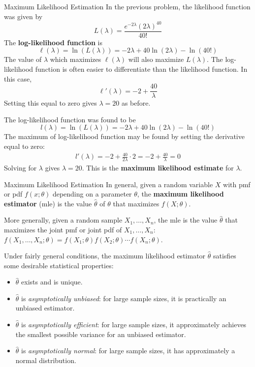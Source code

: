 \documentclass[handout]{beamer}
\renewcommand{\emph}{\textbf}
\begin{document}
\begin{frame}{Maximum Likelihood Estimation}
In the previous problem, the likelihood function was given by
$$L(\lambda)=\frac{e^{-2\lambda}(2\lambda)^{40}}{40!}$$
\pause The \emph{log-likelihood function} is
$$\ell(\lambda) = \ln(L(\lambda)) = -2\lambda+40\ln(2\lambda)-\ln(40!)$$
\pause The value of $\lambda$ which maximizes $\ell(\lambda)$ will also maximize $L(\lambda)$. The log-likelihood function is often easier to differentiate than the likelihood function. 
\pause In this case,
$$\ell'(\lambda) = -2+\frac{40}\lambda$$
\pause Setting this equal to zero gives $\lambda=20$ as before.
\end{frame}
%
\begin{frame}
The log-likelihood function was found to be
$$l(\lambda)=\ln(L(\lambda)) = -2\lambda+40\ln(2\lambda)-\ln(40!)$$
The maximum of log-likelihood function may be found by setting the derivative equal to zero:
\begin{align*}
l'(\lambda) = -2+\frac{40}{2\lambda}\cdot 2 = -2+\frac{40}{\lambda} = 0
\end{align*}
Solving for $\lambda$ gives $\lambda=20$. This is the \emph{maximum likelihood estimate} for $\lambda$.
\end{frame}
\begin{frame}{Maximum Likelihood Estimation}
In general, given a random variable $X$ with pmf or pdf $f(x; \theta)$ depending on a parameter $\theta$, the \emph{maximum likelihood estimator} (mle) is the value $\hat\theta$ of $\theta$ that maximizes $f(X; \theta)$. 

\vspace{.2cm}
\pause More generally, given a random sample $X_1,\dots,X_n$, the mle is the value $\hat\theta$ that maximizes the joint pmf or joint pdf of $X_1,\dots,X_n$: $f(X_1,\dots,X_n; \theta)=f(X_1;\theta)f(X_2;\theta)\cdots f(X_n;\theta)$.

\pause \vspace{.2cm}Under fairly general conditions, the maximum likelihood estimator $\hat\theta$ satisfies some desirable statistical properties:
\begin{itemize}
\pause \item $\hat\theta$ exists and is unique.
\pause \item $\hat\theta$ is \textit{asymptotically unbiased}: for large sample sizes, it is practically an unbiased estimator. 
\pause \item $\hat\theta$ is \textit{asymptotically efficient}: for large sample sizes, it approximately achieves the smallest possible variance for an unbiased estimator.
\pause \item $\hat\theta$ is \textit{asymptotically normal}: for large sample sizes, it has approximately a normal distribution.
\end{itemize}
\end{frame}
\end{document}
